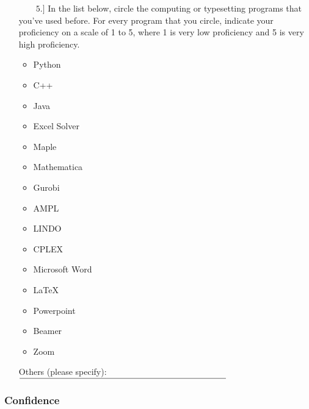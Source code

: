 \documentclass[11pt]{article}
\begin{document}
\begin{enumerate}
\item[{$\qquad 5.]$}] In the list below, circle the computing or typesetting programs that you've used before.  For every program that you circle, indicate your proficiency on a scale of 1 to 5, where 1 is very low proficiency and 5 is very high proficiency. 

\begin{minipage}{.3\textwidth}
\begin{itemize}
	\item Python 
	\item C++
	\item Java
	\item Excel Solver
	\item Maple
\end{itemize}
\end{minipage}
\begin{minipage}{.3\textwidth}
\begin{itemize}
	\item Mathematica
	\item Gurobi
	\item AMPL
	\item LINDO	
	\item CPLEX
\end{itemize}
\end{minipage}
\begin{minipage}{.3\textwidth}
\begin{itemize}
	\item Microsoft Word
	\item \LaTeX
	\item Powerpoint
	\item Beamer
	\item Zoom
\end{itemize}
\end{minipage}\vspace{.75cm}

Others (please specify): $\line(1,0){48}\line(1,0){195}$

\end{enumerate}

\subsubsection*{Confidence}
\end{document}
